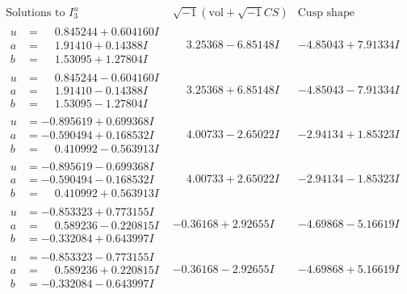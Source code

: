 \documentclass[1p]{elsarticle_modified}
\theoremstyle{definition}
\newcommand{\I}{\sqrt{-1}}
\begin{document}
$$\begin{array}{c|c|c}  
\text{Solutions to }I^u_{3}& \I (\text{vol} + \sqrt{-1}CS) & \text{Cusp shape}\\
 \hline 
\begin{aligned}
u &= \phantom{-}0.845244 + 0.604160 I \\
a &= \phantom{-}1.91410 + 0.14388 I \\
b &= \phantom{-}1.53095 + 1.27804 I\end{aligned}
 & \phantom{-}3.25368 - 6.85148 I & -4.85043 + 7.91334 I \\ \hline\begin{aligned}
u &= \phantom{-}0.845244 - 0.604160 I \\
a &= \phantom{-}1.91410 - 0.14388 I \\
b &= \phantom{-}1.53095 - 1.27804 I\end{aligned}
 & \phantom{-}3.25368 + 6.85148 I & -4.85043 - 7.91334 I \\ \hline\begin{aligned}
u &= -0.895619 + 0.699368 I \\
a &= -0.590494 + 0.168532 I \\
b &= \phantom{-}0.410992 - 0.563913 I\end{aligned}
 & \phantom{-}4.00733 - 2.65022 I & -2.94134 + 1.85323 I \\ \hline\begin{aligned}
u &= -0.895619 - 0.699368 I \\
a &= -0.590494 - 0.168532 I \\
b &= \phantom{-}0.410992 + 0.563913 I\end{aligned}
 & \phantom{-}4.00733 + 2.65022 I & -2.94134 - 1.85323 I \\ \hline\begin{aligned}
u &= -0.853323 + 0.773155 I \\
a &= \phantom{-}0.589236 - 0.220815 I \\
b &= -0.332084 + 0.643997 I\end{aligned}
 & -0.36168 + 2.92655 I & -4.69868 - 5.16619 I \\ \hline\begin{aligned}
u &= -0.853323 - 0.773155 I \\
a &= \phantom{-}0.589236 + 0.220815 I \\
b &= -0.332084 - 0.643997 I\end{aligned}
 & -0.36168 - 2.92655 I & -4.69868 + 5.16619 I \\ \hline\begin{aligned}

\end{aligned}
\end{array}$$
\end{document}
